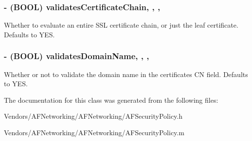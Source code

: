 \subsubsection[{validates\+Certificate\+Chain}]{\setlength{\rightskip}{0pt plus 5cm}-\/ (B\+O\+O\+L) validates\+Certificate\+Chain\hspace{0.3cm}{\ttfamily [read]}, {\ttfamily [write]}, {\ttfamily [nonatomic]}, {\ttfamily [assign]}}\label{interface_a_f_security_policy_a8a87a524e04a9229126490ecfe99dac5}
Whether to evaluate an entire S\+S\+L certificate chain, or just the leaf certificate. Defaults to {\ttfamily Y\+E\+S}. \hypertarget{interface_a_f_security_policy_ae088468652f51c0f92203ef827e1aef0}{}
\subsubsection[{validates\+Domain\+Name}]{\setlength{\rightskip}{0pt plus 5cm}-\/ (B\+O\+O\+L) validates\+Domain\+Name\hspace{0.3cm}{\ttfamily [read]}, {\ttfamily [write]}, {\ttfamily [nonatomic]}, {\ttfamily [assign]}}\label{interface_a_f_security_policy_ae088468652f51c0f92203ef827e1aef0}
Whether or not to validate the domain name in the certificate\textquotesingle{}s C\+N field. Defaults to {\ttfamily Y\+E\+S}. 

The documentation for this class was generated from the following files\+:\begin{DoxyCompactItemize}
\item 
Vendors/\+A\+F\+Networking/\+A\+F\+Networking/A\+F\+Security\+Policy.\+h\item 
Vendors/\+A\+F\+Networking/\+A\+F\+Networking/A\+F\+Security\+Policy.\+m\end{DoxyCompactItemize}
